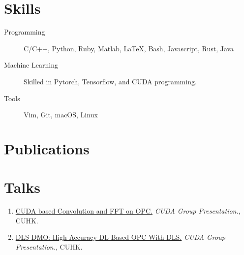 \documentclass{mycv}
\begin{document}
\section{Skills}

\begin{description}
  \item[Programming] C/C++, Python, Ruby, Matlab, \LaTeX, Bash, Javascript, Rust, Java
  \item[Machine Learning] Skilled in Pytorch, Tensorflow, and CUDA programming.
  \item[Tools] Vim, Git, macOS, Linux
\end{description}

\section{Publications}%


\section{Talks}

\begin{enumerate}
  \item \href{https://dekura.github.io/data/slides/20200321-fft.pdf}{CUDA based Convolution and FFT on OPC.} \emph{CUDA Group Presentation.}, CUHK. 
  \item \href{https://dekura.github.io/data/slides/20200514-opc.pdf}{DLS-DMO: High Accuracy DL-Based OPC With DLS.} \emph{CUDA Group Presentation.}, CUHK. 
\end{enumerate}
\end{document}
